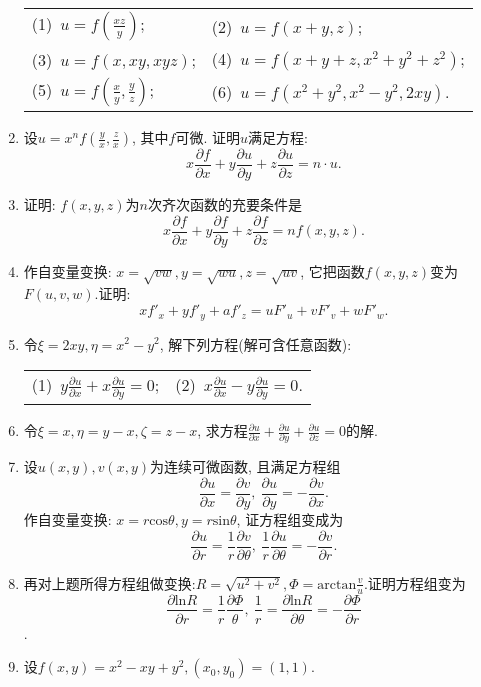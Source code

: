 \begin{enumerate}
\begin{table}[H]
\begin{tabular}{ll}
		(1)\ $u=f(\frac{xz}{y})$;\qquad \qquad \qquad \qquad &(2)\ $u=f(x+y,z)$;\\
		(3)\ $u=f(x,xy,xyz)$;\qquad \qquad \qquad \qquad &(4)\ $u=f(x+y+z,x^2+y^2+z^2)$;\\
		(5)\ $u=f(\frac{x}{y},\frac{y}{z})$;\qquad \qquad \qquad \qquad & (6)\ $u=f(x^2+y^2,x^2-y^2,2xy)$.
	\end{tabular}
\end{table}
\item 设$u=x^nf(\frac{y}{x},\frac{z}{x})$, 其中$f$可微. 证明$u$满足方程:
$$ x\frac{\partial f}{\partial x}+y\frac{\partial u}{\partial y} +z \frac{\partial u}{\partial z}=n\cdot u.$$
\item 证明: $f(x,y,z)$为$n$次齐次函数的充要条件是
$$ x\frac{\partial f}{\partial x}+y\frac{\partial f}{\partial y}+z\frac{\partial f}{\partial z}= nf(x,y,z).$$
\item 作自变量变换: $x=\sqrt{vw},y=\sqrt{wu},z=\sqrt{uv}$, 它把函数$f(x,y,z)$变为$F(u,v,w)$.证明:
$$xf'_x+yf'_y+af'_z=uF'_u+vF'_v+wF'_w.$$
\item 令$\xi =2xy,\eta =x^2-y^2$, 解下列方程(解可含任意函数):
\begin{table}[H]
	\begin{tabular}{ll}
		(1)\ $y\frac{\partial u}{\partial x}+x\frac{\partial u}{\partial y}=0$; \qquad \qquad \qquad \qquad \qquad &(2)\ $x\frac{\partial u}{\partial x}-y\frac{\partial u}{\partial y}=0$.
	\end{tabular}
\end{table}
\item 令$\xi = x,\eta = y-x,\zeta =z-x$, 求方程$\frac{\partial u}{\partial x}+\frac{\partial u}{\partial y}+\frac{\partial u}{\partial z}=0$的解.
\item 设$u(x,y),v(x,y)$为连续可微函数, 且满足方程组
$$ \frac{\partial u}{\partial x}=\frac{\partial v}{\partial y},\ \frac{\partial u}{\partial y}=-\frac{\partial v}{\partial x}.$$
作自变量变换: $x=r\mathrm{cos}\theta, y=r\mathrm{sin}\theta$, 证方程组变成为
$$ \frac{\partial u}{\partial r}=\frac{1}{r}\frac{\partial v}{\partial \theta}, \ \frac{1}{r}\frac{\partial u}{\partial \theta}=-\frac{\partial v}{\partial r}.$$
\item 再对上题所得方程组做变换:$R=\sqrt{u^2+v^2}, \varPhi=\mathrm{arctan}\frac{v}{u}$.证明方程组变为
$$\frac{\partial \mathrm{ln}R}{\partial r}=\frac{1}{r}\frac{\partial \varPhi}{\theta},\ \frac{1}{r}=\frac{\partial \mathrm{ln}R}{\partial \theta}=-\frac{\partial \varPhi}{\partial r}$$.
\item 设$f(x,y)=x^2-xy+y^2, (x_0,y_0)=(1,1)$.

\end{enumerate}
